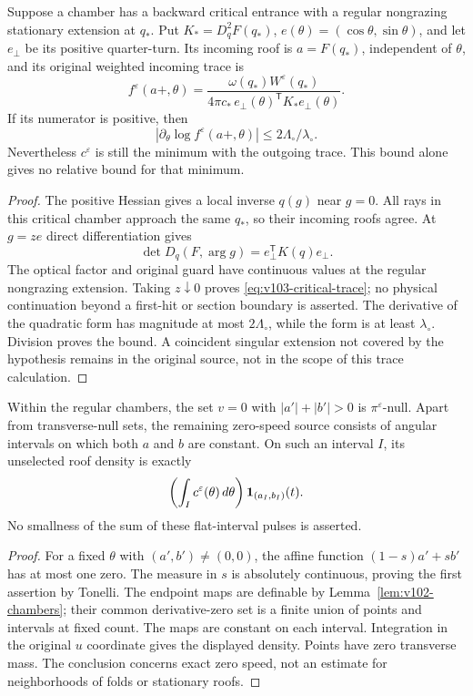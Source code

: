 \begin{proposition}
\label{prop:v103-critical-trace}
Suppose a chamber has a backward critical entrance with a regular
nongrazing stationary extension at $q_*$. Put $K_*=D_q^2F(q_*)$,
$e(\theta)=(\cos\theta,\sin\theta)$, and let $e_\perp$ be its
positive quarter-turn. Its incoming roof is $a=F(q_*)$, independent
of $\theta$, and its original weighted incoming trace is
\begin{equation}\label{eq:v103-critical-trace}
 f^\varepsilon(a+,\theta)=
 \frac{\omega(q_*)W^\varepsilon(q_*)}
      {4\pi c_*\,e_\perp(\theta)^{\mathsf T}K_*e_\perp(\theta)}.
\end{equation}
If its numerator is positive, then
\[
 |\partial_\theta\log f^\varepsilon(a+,\theta)|
                    \le 2\Lambda_\circ/\lambda_\circ.
\]
Nevertheless $c^\varepsilon$ is still the minimum with the outgoing
trace. This bound alone gives no relative bound for that minimum.
\end{proposition}
\begin{proof}
The positive Hessian gives a local inverse $q(g)$ near $g=0$.
All rays in this critical chamber approach the same $q_*$, so their
incoming roofs agree. At $g=ze$ direct differentiation gives
\[
 \det D_q(F,\arg g)=e_\perp^{\mathsf T}K(q)e_\perp.
\]
The optical factor and original guard have continuous values at the
regular nongrazing extension. Taking $z\downarrow0$ proves
\eqref{eq:v103-critical-trace}; no physical continuation beyond a
first-hit or section boundary is asserted. The derivative of the
quadratic form has magnitude at most $2\Lambda_\circ$, while the
form is at least $\lambda_\circ$. Division proves the bound.
A coincident singular extension not covered by the hypothesis remains
in the original source, not in the scope of this trace calculation.
\end{proof}

\begin{lemma}
\label{lem:v103-flat}
Within the regular chambers, the set $v=0$ with
$|a'|+|b'|>0$ is $\pi^\varepsilon$-null. Apart from transverse-null
sets, the remaining zero-speed source consists of angular intervals
on which both $a$ and $b$ are constant. On such an interval $I$,
its unselected roof density is exactly
\[
 \left(\int_Ic^\varepsilon(\theta)\,d\theta\right)
                  \mathbf1_{(a_I,b_I)}(t).
\]
No smallness of the sum of these flat-interval pulses is asserted.
\end{lemma}
\begin{proof}
For a fixed $\theta$ with $(a',b')\ne(0,0)$, the affine function
$(1-s)a'+sb'$ has at most one zero. The measure in $s$ is absolutely
continuous, proving the first assertion by Tonelli. The endpoint
maps are definable by Lemma~\ref{lem:v102-chambers}; their common
derivative-zero set is a finite union of points and intervals at
fixed count. The maps are constant on each interval. Integration
in the original $u$ coordinate gives the displayed density. Points
have zero transverse mass. The conclusion concerns exact zero
speed, not an estimate for neighborhoods of folds or stationary roofs.
\end{proof}
